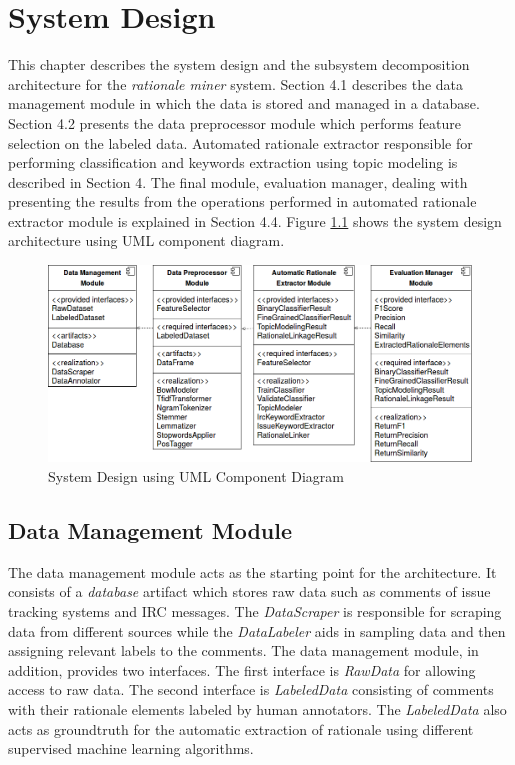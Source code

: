 \documentclass[a4paper,12pt,twoside]{report}
\begin{document}
\chapter{System Design}
This chapter describes the system design and the subsystem decomposition architecture for the \textit{rationale miner} system. Section 4.1 describes the data management module in which the data is stored and managed in a database. Section 4.2 presents the data preprocessor module which performs feature selection on the labeled data. Automated rationale extractor responsible for performing classification and keywords extraction using topic modeling is described in Section 4. The final module, evaluation manager, dealing with presenting the results from the operations performed in automated rationale extractor module is explained in Section 4.4. Figure \ref{fig:systemDecomposition} shows the system design architecture using UML component diagram. 
\begin{figure}[h] %
    \centering
    \includegraphics[width=14cm]{system-decomposition}
    \caption{System Design using UML Component Diagram}
    \label{fig:systemDecomposition}
\end{figure}

\section{Data Management Module}
The data management module acts as the starting point for the architecture. It consists of a \textit{database} artifact which stores raw data such as comments of issue tracking systems and \acs{IRC} messages. The \textit{DataScraper} is responsible for scraping data from different sources while the \textit{DataLabeler} aids in sampling data and then assigning relevant labels to the comments. The data management module, in addition, provides two interfaces. The first interface is \textit{RawData} for allowing access to raw data. The second interface is \textit{LabeledData} consisting of comments with their rationale elements labeled by human annotators. The \textit{LabeledData} also acts as groundtruth for the automatic extraction of rationale using different supervised machine learning algorithms. 
\end{document}
